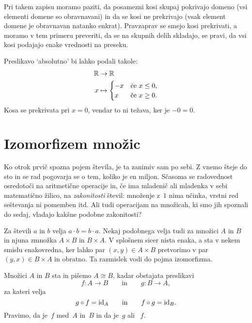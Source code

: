 Pri takem zapisu moramo paziti, da posamezni kosi skupaj pokrivajo domeno (vsi elementi domene so obravnavani) in da se kosi ne prekrivajo (vsak element domene je obravnavan natanko enkrat). Pravzaprav se smejo kosi prekrivati, a moramo v tem primeru preveriti, da se na skupnih delih skladajo, se pravi, da vsi kosi podajajo enake vrednosti na preseku.

\begin{zgled}
  Preslikavo `absolutno' bi lahko podali takole:
  \begin{align*}
    \RR &\to \RR \\
    x &\mapsto
    \begin{cases}
      -x & \text{če $x \leq 0$,}\\
       x & \text{če $x \geq 0$.}
    \end{cases}
  \end{align*}
  Kosa se prekrivata pri $x = 0$, vendar to ni težava, ker je $-0 = 0$.
\end{zgled}


\section{Izomorfizem množic}
\label{sec:izomorfizem-mnozic}

Ko otrok prvič spozna pojem števila, je ta zanimiv sam po sebi. Z vnemo šteje do sto in se
rad pogovarja se o tem, koliko je en miljon. Sčasoma se radovednost osredotoči na
aritmetične operacije in, če ima mladenič ali mladenka v sebi matematično žilico, na
\emph{zakonitosti} števil: množenje z~$1$ nima učinka, vrstni red seštevanja ni pomemben
itd. Ali tudi operacijam na množicah, ki smo jih spoznali do sedaj, vladajo kakšne
podobne zakonitosti?

Za števili $a$ in $b$ velja $a \cdot b = b \cdot a$. Nekaj podobnega velja tudi za množici
$A$ in $B$ in njuna zmnožka $A \times B$ in $B \times A$. V splošnem sicer nista enaka, a
sta v nekem smislu enakovredna, ker lahko par $(x, y) \in A \times B$ pretvorimo v par
$(y, x) \in B \times A$ in obratno. Ta razmislek vodi do pojma izomorfizma.


\begin{definicija}
  Množici $A$ in $B$ sta  in pišemo $A \cong B$, kadar obstajata preslikavi
  \begin{equation*}
    f : A \to B
    \qquad\text{in}\qquad
    g : B \to A,
  \end{equation*}
  za kateri velja
  \begin{equation*}
    g \circ f = \id[A]
    \qquad\text{in}\qquad
    f \circ g = \id[B].
  \end{equation*}
  Pravimo, da je~$f$  med~$A$ in~$B$ in da je~$g$  ali
  ~$f$.
\end{definicija}


